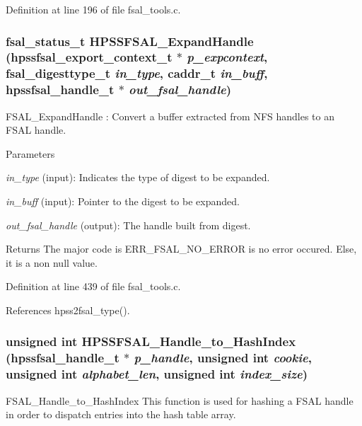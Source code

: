 Definition at line 196 of file fsal\_\-tools.c.
\subsubsection[{HPSSFSAL\_\-ExpandHandle}]{\setlength{\rightskip}{0pt plus 5cm}fsal\_\-status\_\-t HPSSFSAL\_\-ExpandHandle (hpssfsal\_\-export\_\-context\_\-t $\ast$ {\em p\_\-expcontext}, \/  fsal\_\-digesttype\_\-t {\em in\_\-type}, \/  caddr\_\-t {\em in\_\-buff}, \/  hpssfsal\_\-handle\_\-t $\ast$ {\em out\_\-fsal\_\-handle})}\label{fsal__tools_8c_a6b14735ce5783b50545e322d4f0e7d5b}
FSAL\_\-ExpandHandle : Convert a buffer extracted from NFS handles to an FSAL handle.


\begin{DoxyParams}{Parameters}
\item[{\em in\_\-type}](input): Indicates the type of digest to be expanded. \item[{\em in\_\-buff}](input): Pointer to the digest to be expanded. \item[{\em out\_\-fsal\_\-handle}](output): The handle built from digest.\end{DoxyParams}
\begin{DoxyReturn}{Returns}
The major code is ERR\_\-FSAL\_\-NO\_\-ERROR is no error occured. Else, it is a non null value. 
\end{DoxyReturn}


Definition at line 439 of file fsal\_\-tools.c.

References hpss2fsal\_\-type().
\subsubsection[{HPSSFSAL\_\-Handle\_\-to\_\-HashIndex}]{\setlength{\rightskip}{0pt plus 5cm}unsigned int HPSSFSAL\_\-Handle\_\-to\_\-HashIndex (hpssfsal\_\-handle\_\-t $\ast$ {\em p\_\-handle}, \/  unsigned int {\em cookie}, \/  unsigned int {\em alphabet\_\-len}, \/  unsigned int {\em index\_\-size})}\label{fsal__tools_8c_aecd98c40de9892f07d7cfb5b4087cb36}
FSAL\_\-Handle\_\-to\_\-HashIndex This function is used for hashing a FSAL handle in order to dispatch entries into the hash table array.


